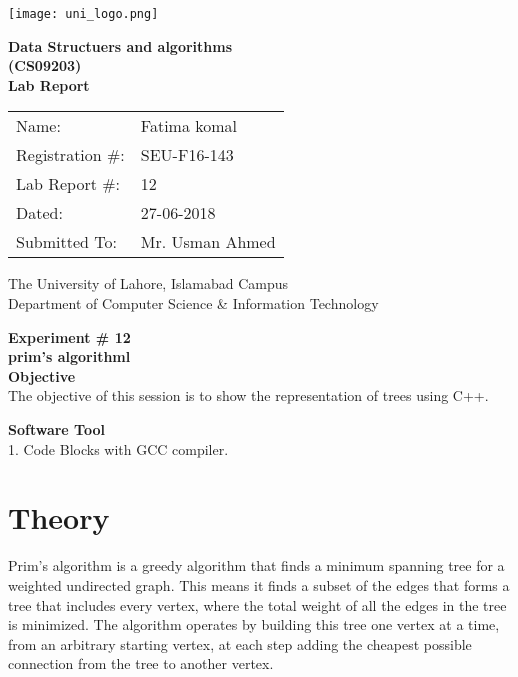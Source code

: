 \documentclass[11pt]{article}            %
\begin{document}
\begin{titlepage}
    \centering
  \vfill
    \texttt{[image: uni\_logo.png]} \\ 
	\vskip2cm
    {\bfseries\Large
	Data Structuers and algorithms \\ (CS09203)\\
	
	\vskip2cm
	Lab Report 
	 
	\vskip2cm
	}    

\begin{center}
\begin{tabular}{ l l  } 

Name: & Fatima komal \\ 
Registration \#: & SEU-F16-143 \\ 
Lab Report \#: & 12 \\ 
 Dated:& 27-06-2018\\ 
Submitted To:& Mr. Usman Ahmed\\ 

\end{tabular}
\end{center}
    \vfill
    The University of Lahore, Islamabad Campus\\
Department of Computer Science \& Information Technology
\end{titlepage}


    
    {\bfseries\Large
\centering
	Experiment \# 12 \\

prim's algorithml \\
	
	}    
 \vskip1cm
 \textbf {Objective}\\ The objective of this session is to show the representation of trees using C++. 
 
 \textbf {Software Tool} \\
 1. Code Blocks with GCC compiler.

\section{Theory }              

 Prim's algorithm is a greedy algorithm that finds a minimum spanning tree for a weighted undirected graph. This means it finds a subset of the edges that forms a tree that includes every vertex, where the total weight of all the edges in the tree is minimized. The algorithm operates by building this tree one vertex at a time, from an arbitrary starting vertex, at each step adding the cheapest possible connection from the tree to another vertex.
\end{document}
